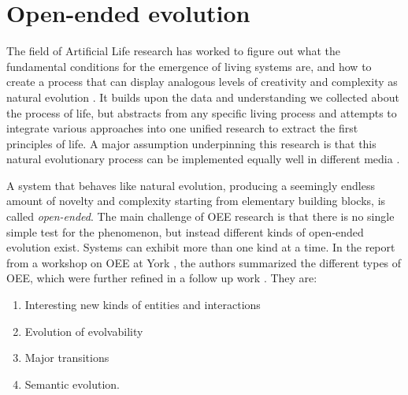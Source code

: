 \section{Open-ended evolution\label{sec:open-ended-evolution-1}}
The field of Artificial Life research has worked to figure out what the
fundamental conditions for the emergence of living systems are, and how to
create a process that can display analogous levels of creativity and complexity
as natural evolution \parencite{eigenHypercycle1979,
  langtonArtificialLifeProceedings1989, dysonOriginsLife1999,
  stanleyWhyOpenEndednessMatters2019, packardOverviewOpenEndedEvolution2019,
  sorosOpenendednessLastGrand2017}. It builds upon the data and understanding we
collected about the process of life, but abstracts from any specific living
process and attempts to integrate various approaches into one unified research
to extract the first principles of life. A major assumption underpinning this
research is that this natural evolutionary process can be implemented equally
well in different media \parencite{dennettDarwinDangerousIdea1996}.

A system that behaves like natural evolution, producing a seemingly endless
amount of novelty and complexity starting from elementary building blocks, is
called \emph{open-ended}. The main challenge of \ac{OEE} research is that there is
no single simple test for the phenomenon, but instead different kinds of
open-ended evolution exist. Systems can exhibit more than one kind at a time. In
the report from a workshop on \ac{OEE} at York
\parencite{taylorOpenEndedEvolutionPerspectives2016}, the authors summarized the
different types of \ac{OEE}, which were further refined in a follow up work
\parencite{packardOverviewOpenEndedEvolution2019}. They are:

\begin{enumerate}
  \item Interesting new kinds of entities and interactions
  \item Evolution of evolvability
  \item Major transitions
  \item Semantic evolution.
\end{enumerate}


